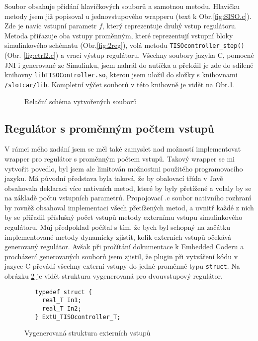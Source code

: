 \documentclass[thesis=M,czech,hidelinks]{FITthesis}[2012/06/26]
\begin{document}
Soubor obsahuje přidání hlavičkových souborů a samotnou metodu. Hlavičku metody jsem již popisoval u jednovstupového wrapperu (text k Obr.\ref{fig:SISO.c}). Zde je navíc vstupní parametr $f$, který reprezentuje druhý vstup regulátoru. Metoda přiřazuje oba vstupy proměnným, které reprezentují vstupní bloky simulinkového schématu (Obr.\ref{fig:2reg}), volá metodu \texttt{TISOcontroller\_step()}  (Obr. \ref{fig:ctrl2.c}) a vrací výstup regulátoru. Všechny soubory jazyka C, pomocné JNI i generované ze Simulinku, jsem nahrál do autíčka a přeložil je zde do sdílené knihovny \texttt{libTISOController.so}, kterou jsem uložil do složky s knihovnami \texttt{/slotcar/lib}. Kompletní výčet souborů v této knihovně je vidět na Obr.\ref{fig:tiso}.
 \begin{figure}[h]
         \centering
         \caption{Relační schéma vytvořených souborů}
         \label{fig:tiso}
 \end{figure}
  
\subsection{Regulátor s proměnným počtem vstupů}
V rámci mého zadání jsem se měl také zamyslet nad možností implementovat wrapper pro regulátor s proměnným počtem vstupů. Takový wrapper se mi vytvořit povedlo, byl jsem ale limitován možnostmi použitého programovacího jazyku. Má původní představa byla taková, že by obalovací třída v Javě obsahovala deklaraci více nativních metod, které by byly přetížené a volaly by se na základě počtu vstupních parametrů. Propojovací .c soubor nativního rozhraní by rovněž obsahoval implementaci všech přetížených metod, a uvnitř každé z nich by se přiřadil příslušný počet vstupů metody externímu vstupu simulinkového regulátoru. Můj předpoklad počítal s tím, že bych byl schopný na začátku implementované metody dynamicky zjistit, kolik externích vstupů očekává generovaný regulátor. Avšak při pročítání dokumentace k Embedded Coderu a procházení generovaných souborů jsem zjistil, že plugin při vytváření kódu v jazyce C převádí všechny externí vstupy do jedné proměnné typu \texttt{struct}. Na obrázku \ref{fig:2struct} je vidět struktura vygenerovaná pro dvouvstupový regulátor. 
 \begin{figure}[h]           
   \begin{verbatim}
   typedef struct {
     real_T In1;       
     real_T In2;        
   } ExtU_TISOcontroller_T; 
   \end{verbatim}      
   \caption{Vygenerovaná struktura externích vstupů}
   \label{fig:2struct}
 \end{figure}
\end{document}
